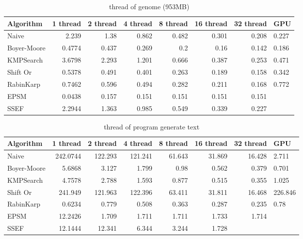 \documentclass[11pt]{article}       %
\begin{document}
\begin{table}[htbp]
  \centering
  \caption{thread of genome (953MB)}
    \begin{tabular}{lrrrrrr}\label{t5}
Algorithm & 1 thread & 2 thread & 4 thread & 8 thread & 16 thread & 32 thread & GPU \\
 \hline
    Naive & 2.239 & 1.38  & 0.862 & 0.482 & 0.301 & 0.208 & 0.227 \\
    {Boyer-Moore} & 0.4774 & 0.437 & 0.269 & 0.2   & 0.16  & 0.142 & 0.186 \\
    KMPSearch & 3.6798 & 2.293 & 1.201 & 0.666 & 0.387 & 0.253 & 0.471 \\
    Shift Or & 0.5378 & 0.491 & 0.401 & 0.263 & 0.189 & 0.158 & 0.342 \\
    RabinKarp & 0.7462 & 0.596 & 0.494 & 0.282 & 0.211 & 0.168 & 0.772 \\
    EPSM  & 0.0438 & 0.157 & 0.151 & 0.151 & 0.151 & 0.151  \\
    SSEF  & 2.2944 & 1.363 & 0.985 & 0.549 & 0.339 & 0.227  \\
    \end{tabular}%
  \label{tab:addlabel}%
\end{table}%



\begin{table}[htbp]
  \centering
  \caption{thread of program generate text}
    \begin{tabular}{lrrrrrr}\label{t6}
Algorithm & 1 thread & 2 thread & 4 thread & 8 thread & 16 thread & 32 thread & GPU \\
 \hline
    Naive & 242.0744 & 122.293 & 121.241 & 61.643 & 31.869 & 16.428 & 2.711 \\
    Boyer-Moore & 5.6868 & 3.127 & 1.799 & 0.98  & 0.562 & 0.379 & 0.701 \\
    KMPSearch & 4.7578 & 2.788 & 1.593 & 0.877 & 0.515 & 0.355 & 1.025 \\
    Shift Or & 241.949 & 121.963 & 122.396 & 63.411 & 31.811 & 16.468 & 226.846 \\
    RabinKarp & 0.6234 & 0.779 & 0.508 & 0.363 & 0.287 & 0.235 & 0.78 \\
    EPSM  & 12.2426 & 1.709 & 1.711 & 1.711 & 1.733 & 1.714 &  \\
    SSEF  & 12.1444 & 12.341 & 6.344 & 3.244 & 1.728 &       &  \\
    \end{tabular}%
  \label{tab:addlabel}%
\end{table}%
\end{document}
